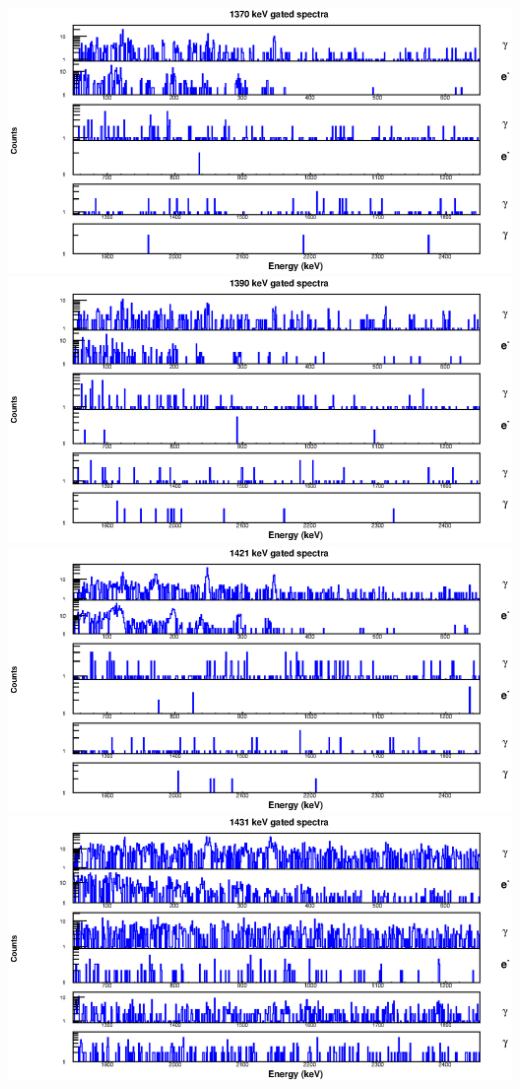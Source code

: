 \begin{landscape}
\includegraphics[scale=1.2]{154Gd_Appendix/1370_combined.eps}
\includegraphics[scale=1.2]{154Gd_Appendix/1390_combined.eps}
\includegraphics[scale=1.2]{154Gd_Appendix/1421_combined.eps}
\includegraphics[scale=1.2]{154Gd_Appendix/1431_combined.eps}

\end{landscape}
